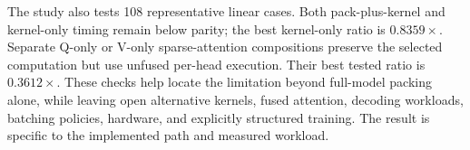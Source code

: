 The study also tests 108 representative linear cases. Both pack-plus-kernel
and kernel-only timing remain below parity; the best kernel-only ratio is
$0.8359\times$. Separate Q-only or V-only sparse-attention compositions
preserve the selected computation but use unfused per-head execution.
Their best tested ratio is $0.3612\times$.
These checks help locate the limitation beyond full-model packing alone,
while leaving open alternative kernels, fused attention, decoding workloads,
batching policies, hardware, and explicitly structured training.
The result is specific to the implemented path and measured workload.
